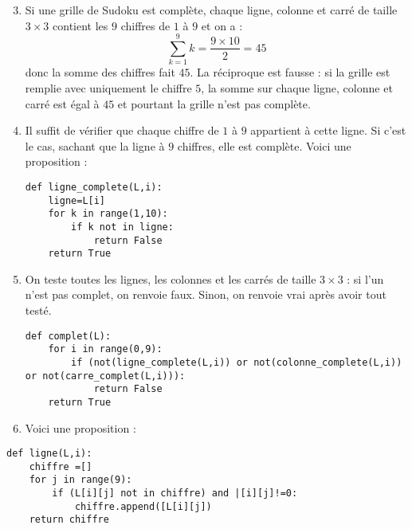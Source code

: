 \documentclass[a4paper,twoside,french,10pt]{VcCours}
\begin{document}
\medskip
\begin{enumerate}
\setcounter{enumi}{2}
\item Si une grille de Sudoku est complète, chaque ligne, colonne et carré de taille $3 \times 3$ contient les $9$ chiffres de $1$ à $9$ et on a :
$$ \sum_{k=1}^9 k = \dfrac{9 \times 10}{2} = 45$$
donc la somme des chiffres fait $45$. La réciproque est fausse : si la grille est remplie avec uniquement le chiffre $5$, la somme sur chaque ligne, colonne et carré est égal à $45$ et pourtant la grille n'est pas complète.
\item Il suffit de vérifier que chaque chiffre de $1$ à $9$ appartient à cette ligne. Si c'est le cas, sachant que la ligne à $9$ chiffres, elle est complète. Voici une proposition :

\begin{center}
\begin{minipage}{0.7\textwidth}
		
\begin{lstlisting}
def ligne_complete(L,i):
    ligne=L[i]
    for k in range(1,10):
        if k not in ligne:
    	    return False
    return True
\end{lstlisting}

\end{minipage}
\end{center}

\item On teste toutes les lignes, les colonnes et les carrés de taille $3 \times 3$ : si l'un n'est pas complet, on renvoie faux. Sinon, on renvoie vrai après avoir tout testé.

\begin{center}
\begin{minipage}{0.76\textwidth}
		
\begin{lstlisting}
def complet(L):
    for i in range(0,9):
        if (not(ligne_complete(L,i)) or not(colonne_complete(L,i)) or not(carre_complet(L,i))):
    	    return False
    return True 
\end{lstlisting}

\end{minipage}
\end{center}
\item Voici une proposition : 
\end{enumerate}

\begin{center}
\begin{minipage}{0.7\textwidth}
		
\begin{lstlisting}
def ligne(L,i):
    chiffre =[]
    for j in range(9):
        if (L[i][j] not in chiffre) and |[i][j]!=0:
            chiffre.append([L[i][j])
    return chiffre
\end{lstlisting}

\end{minipage}
\end{center}
\end{document}
